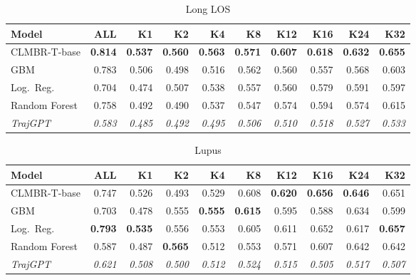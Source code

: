 \documentclass{article}
\newcommand{\B}[1]{\textbf{#1}}
\newcommand{\IT}[1]{\textit{#1}}
\begin{document}
\begin{table}[ht]
\centering\caption{Long LOS}
\begin{tabular}{l *{9}{r}}
\toprule
\textbf{Model} & \textbf{ALL} & \textbf{K1} & \textbf{K2} & \textbf{K4} & \textbf{K8} & \textbf{K12} & \textbf{K16} & \textbf{K24} & \textbf{K32} \\
\midrule
CLMBR-T-base  & \B{0.814} & \B{0.537} & \B{0.560} & \B{0.563} & \B{0.571} & \B{0.607} & \B{0.618} & \B{0.632} & \B{0.655} \\
GBM           & 0.783     & 0.506     & 0.498     & 0.516     & 0.562     & 0.560     & 0.557     & 0.568     & 0.603     \\
Log.\ Reg.    & 0.704     & 0.474     & 0.507     & 0.538     & 0.557     & 0.560     & 0.579     & 0.591     & 0.597     \\
Random Forest & 0.758     & 0.492     & 0.490     & 0.537     & 0.547     & 0.574     & 0.594     & 0.574     & 0.615     \\
\IT{TrajGPT}  & \IT{0.583} & \IT{0.485} & \IT{0.492} & \IT{0.495} & \IT{0.506} & \IT{0.510} & \IT{0.518} & \IT{0.527} & \IT{0.533} \\
\bottomrule
\end{tabular}
\end{table}

\begin{table}[ht]
\centering\caption{Lupus}
\begin{tabular}{l *{9}{r}}
\toprule
\textbf{Model} & \textbf{ALL} & \textbf{K1} & \textbf{K2} & \textbf{K4} & \textbf{K8} & \textbf{K12} & \textbf{K16} & \textbf{K24} & \textbf{K32} \\
\midrule
CLMBR-T-base  & 0.747     & 0.526     & 0.493     & 0.529     & 0.608     & \B{0.620} & \B{0.656} & \B{0.646} & 0.651     \\
GBM           & 0.703     & 0.478     & 0.555     & \B{0.555} & \B{0.615} & 0.595     & 0.588     & 0.634     & 0.599     \\
Log.\ Reg.    & \B{0.793} & \B{0.535} & 0.556     & 0.553     & 0.605     & 0.611     & 0.652     & 0.617     & \B{0.657} \\
Random Forest & 0.587     & 0.487     & \B{0.565} & 0.512     & 0.553     & 0.571     & 0.607     & 0.642     & 0.642     \\
\IT{TrajGPT}  & \IT{0.621} & \IT{0.508} & \IT{0.500} & \IT{0.512} & \IT{0.524} & \IT{0.515} & \IT{0.505} & \IT{0.517} & \IT{0.507} \\
\bottomrule
\end{tabular}
\end{table}
\end{document}
